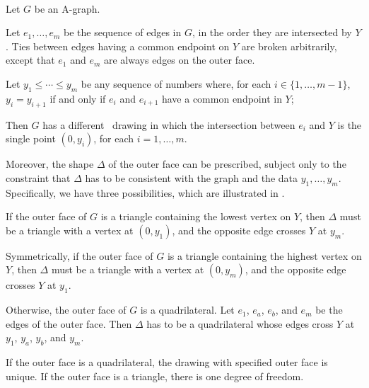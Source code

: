 \begin{thm}
\
\begin{compactitem}
\item Let $G$ be an A-graph.
\item Let $e_1,\ldots,e_m$ be the sequence of edges in $G$,
  in the order they are intersected by $Y$. Ties between edges having
  a common endpoint on $Y$ are broken arbitrarily,
except that $e_1$ and $e_m$ are
always edges on the outer face.
\item Let $y_1\le\cdots\le y_m$ be any sequence of numbers where, for
  each $i\in\{1,\ldots,m-1\}$, $y_i=y_{i+1}$ if and only if $e_i$
  and $e_{i+1}$ have a common endpoint in $Y$;
			
			
\end{compactitem}
Then $G$ has a different \Fary\ drawing in which the intersection
between $e_i$ and $Y$ is the single point $(0,y_i)$, for each
$i=1,\ldots,m$.

Moreover, the shape  $\Delta$ of the outer face can be prescribed,
subject only to the constraint that $\Delta$
has to be consistent with the graph and the data $y_1,\ldots,y_m$.
Specifically, we have three possibilities, which
 are illustrated in .

\begin{compactenum}[a)]
\item If the outer face of $G$ is a triangle containing the lowest
  vertex on $Y$, then $\Delta$ must be a triangle with a vertex at
  $(0,y_1)$, and the opposite edge crosses $Y$ at $y_m$.
\item Symmetrically, if the outer face of $G$ is a triangle containing
  the highest vertex on $Y$, then $\Delta$ must be a triangle with a vertex
  at $(0,y_m)$, and the opposite edge crosses $Y$ at $y_1$.
			
\item Otherwise, the outer face of $G$ is a quadrilateral.  Let $e_1$,
  $e_a$, $e_b$, and $e_m$ be the %
  edges of the outer face.  Then $\Delta$ has to be a quadrilateral
  whose edges cross $Y$ at $y_1$, $y_a$, $y_b$, and $y_m$.
\end{compactenum}
If the outer face is a quadrilateral, the drawing with specified outer
face is unique. If the outer face is a triangle, there is one degree
of freedom.
\end{thm}

